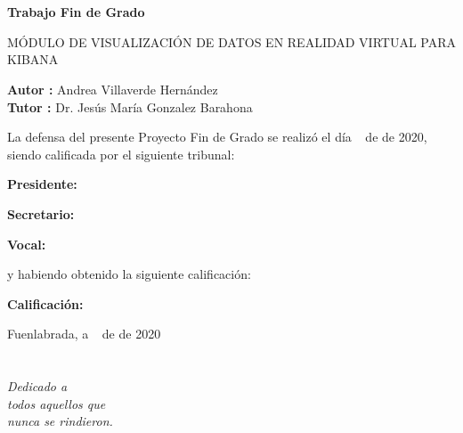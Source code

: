 \documentclass[a4paper, 12pt]{book}
\begin{document}
\newpage
\mbox{}
\thispagestyle{empty} %


\clearpage
{}
\chapter*{}

\vspace{-4cm}
\begin{center}
\large
\textbf{Trabajo Fin de Grado}

\vspace{1cm}
\large
MÓDULO DE VISUALIZACIÓN DE DATOS EN REALIDAD VIRTUAL PARA KIBANA

\vspace{1cm}
\large
\textbf{Autor :} Andrea Villaverde Hernández \\
\textbf{Tutor :} Dr. Jesús María Gonzalez Barahona

\end{center}

\vspace{1cm}
La defensa del presente Proyecto Fin de Grado se realizó el día \qquad$\;\,$ de \qquad\qquad\qquad\qquad \newline de 2020, siendo calificada por el siguiente tribunal:

\vspace{0.5cm}
\textbf{Presidente:}

\vspace{1.2cm}
\textbf{Secretario:}

\vspace{1.2cm}
\textbf{Vocal:}

\vspace{1.2cm}
y habiendo obtenido la siguiente calificación:

\vspace{1cm}
\textbf{Calificación:}


\vspace{1cm}
\begin{flushright}
Fuenlabrada, a \qquad$\;\,$ de \qquad\qquad\qquad\qquad de 2020
\end{flushright}


\chapter*{}
\begin{flushright}
\textit{Dedicado a \\ 
todos aquellos que \\
nunca se rindieron.}
\end{flushright}
\end{document}
